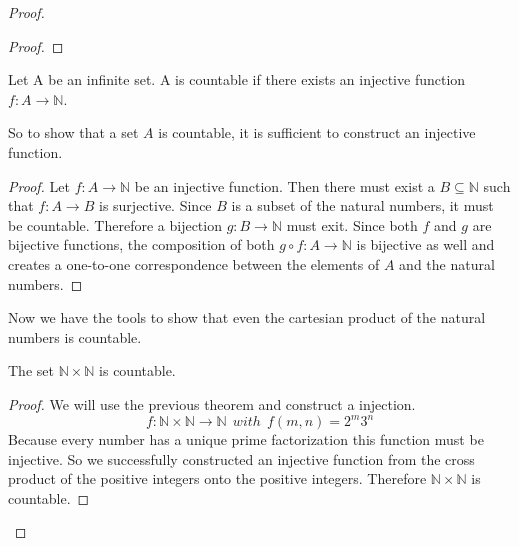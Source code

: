 \documentclass{article}
\theoremstyle{definition}
\begin{document}
\begin{proof}
\begin{proof}
    
\end{proof}

\begin{theorem}
    Let A be an infinite set. A is countable if there exists an injective function $f:A\longrightarrow\mathbb{N}$.
\end{theorem}
So to show that a set $A$ is countable, it is sufficient to construct an injective function. 
\begin{proof}
    Let $f:A\longrightarrow\mathbb{N}$ be an injective function. Then there must exist a $B \subseteq \mathbb{N}$ such that $f:A\longrightarrow B$ is surjective. Since $B$ is a subset of the natural numbers, it must be countable. Therefore a bijection $g:B \longrightarrow \mathbb{N}$ must exit. Since both $f$ and $g$ are bijective functions, the composition of both $g\circ f : A \longrightarrow \mathbb{N}$ is bijective as well and creates a one-to-one correspondence between the elements of $A$ and the natural numbers.
\end{proof}

Now we have the tools to show that even the cartesian product of the natural numbers is countable.

\begin{theorem}
    The set $\mathbb{N} \times  \mathbb{N} $ is countable.
\end{theorem}

\begin{proof}
    We will use the previous theorem and construct a injection.
    \begin{equation}
        f:\mathbb{N} \times  \mathbb{N} \longrightarrow \mathbb{N} \: \: with \: \: f(m,n) = 2^m3^n
    \end{equation}
    Because every number has a unique prime factorization this function must be injective. So we successfully constructed an injective function from the cross product of the positive integers onto the positive integers. Therefore $\mathbb{N} \times \mathbb{N}$ is countable.
\end{proof}


\end{proof}
\end{document}

